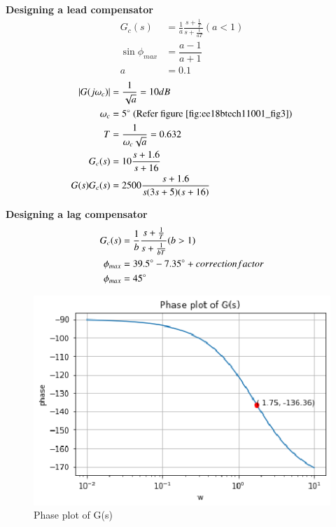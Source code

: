 \textbf{Designing a lead compensator}
\begin{align}
   G_{c}(s) &=  \frac{1}{a}\frac{s + \frac{1}{T}}{s + \frac{1}{aT}} (a<1) \label{eq:ee18btech11001_9}
   \\
   \sin\phi_{max} &= \dfrac{a-1}{a+1}
   \\
   a &= 0.1
\end{align}
\begin{align}
   |G(j\omega_{c})| &= \frac{1}{\sqrt{a}} = 10 dB
   \\
   \omega_{c} &= 5\degree \text{  (Refer figure \ref{fig:ee18btech11001_fig3})}
   \\
   T &= \frac{1}{\omega_{c}\sqrt{a}} = 0.632
   \\
   G_{c}(s) &=  10 \frac{s + 1.6}{s + 16}
   \\
   G(s)G_{c}(s)  &= 2500 \dfrac{s+1.6}{s(3s+5)(s+16)} \label{eq:ee18btech11001_10}
\end{align}

\textbf{Designing a lag compensator}
\begin{align}
   G_{c}(s) &=  \frac{1}{b}\frac{s + \frac{1}{T}}{s + \frac{1}{bT}} (b>1)  \label{eq:ee18btech11001_11}
   \\
   \phi_{max}  &= 39.5\degree -7.35\degree + correction factor
   \\
   \phi_{max} &= 45 \degree
\end{align}
\begin{figure}[!ht]
\centering
    \includegraphics[width=\columnwidth]{./figs/ee18btech11001/ee18btech11001_3.eps}
  \caption{Phase plot of G(s)}
  \label{fig:ee18btech11001_fig2}
\end{figure}


